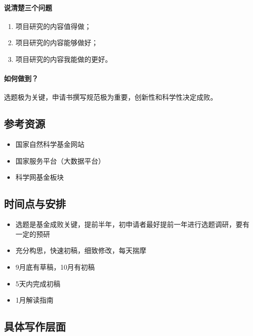 \paragraph{说清楚三个问题}
\begin{enumerate}
\item 项目研究的内容值得做；
\item 项目研究的内容能够做好； 
\item 项目研究的内容我能做的更好。
\end{enumerate}

\paragraph{如何做到？}
选题极为关键，申请书撰写规范极为重要，创新性和科学性决定成败。


\subsection{参考资源}
\begin{itemize}
\item 国家自然科学基金网站
\item 国家服务平台（大数据平台）
\item 科学网基金板块
\end{itemize}


\subsection{时间点与安排}
\begin{itemize}
\item 选题是基金成败关键，提前半年，初申请者最好提前一年进行选题调研，要有一定的预研
\item 充分构思，快速初稿，细致修改，每天揣摩
\item 9月底有草稿，10月有初稿
\item 5天内完成初稿
\item 1月解读指南
\end{itemize}



\subsection{具体写作层面}
